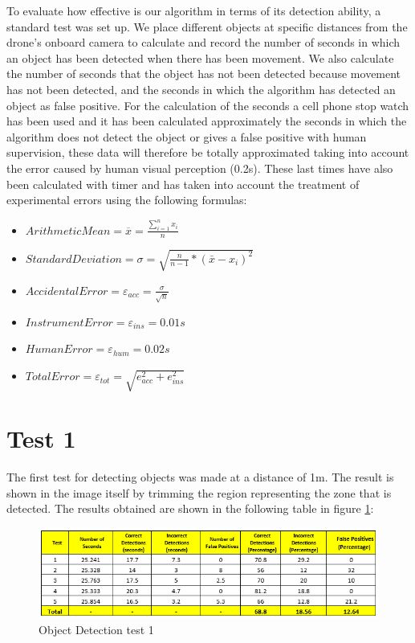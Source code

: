 To evaluate how effective is our algorithm in terms of its detection ability, a standard test was set up. We place different objects at specific distances from the drone’s onboard camera to calculate and record the number of seconds in which an object has been detected when there has been movement. We also calculate the number of seconds that the object has not been detected because movement has not been detected, and the seconds in which the algorithm has detected an object as false positive.  For the calculation of the seconds a cell phone stop watch has been used and it has been calculated approximately the seconds in which the algorithm does not detect the object or gives a false positive with human supervision, these data will therefore be totally approximated taking into account the error caused by human visual perception (0.2s). These last times have also been calculated with timer and has taken into account the treatment of experimental errors using the following formulas:

\begin{itemize}
	\item $ Arithmetic  Mean  = \overline{x} =  {\frac{\sum_{i=1}^{n} x_i }{n}} $ 
	\item $ Standard  Deviation  =  \sigma =  {\sqrt{\frac{n}{n -1}*{(\bar{x} - {x_i})^2}}} $ 
	\item $ Accidental  Error  = \varepsilon{_{acc}} =  {\frac{\sigma}{\sqrt{n}}} $ 	
	\item $ Instrument  Error  = \varepsilon{_{ins}} =  {0.01s} $ 	
	\item $ Human  Error  = \varepsilon{_{hum}} =  {0.02s} $ 	
	\item $ Total  Error  = \varepsilon{_{tot}}=  {\sqrt{e_{acc}^{2} + e_{ins}^{2}}} $ 		 
\end{itemize}

\section{Test 1}
The first test for detecting objects was made at a distance of 1m. The result is shown in the image itself by trimming the region representing the zone that is detected. The results obtained are shown in the following table in figure \ref{object_table_1}:

\begin{figure}[ht]
\centering
\includegraphics[scale=0.8]{figures/test_table_1.png}
\caption{Object Detection test 1}
\label{object_table_1}
\end{figure}

